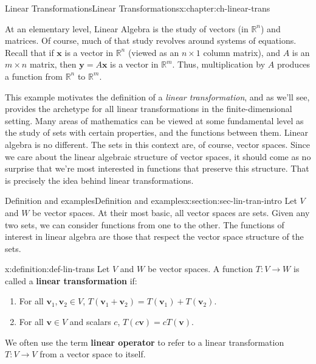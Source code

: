 \documentclass[oneside,10pt,]{book}
\newcommand{\terminology}[1]{\textbf{#1}}
\numberwithin{equation}{section}
\newcommand{\R}{\mathbb{R}}
\newcommand{\vv}{\mathbf{v}}
\newcommand{\xx}{\mathbf{x}}
\newcommand{\yy}{\mathbf{y}}
\begin{document}
\begin{chapterptx}{Linear Transformations}{}{Linear Transformations}{}{}{x:chapter:ch-linear-trans}
\begin{introduction}{}%
At an elementary level, Linear Algebra is the study of vectors (in \(\R^n\)) and matrices. Of course, much of that study revolves around systems of equations. Recall that if \(\xx\) is a vector in \(\R^n\) (viewed as an \(n\times 1\) column matrix), and \(A\) is an \(m\times n\) matrix, then \(\yy=A\xx\) is a vector in \(\R^m\). Thus, multiplication by \(A\) produces a function from \(\R^n\) to \(\R^m\).%
\par
This example motivates the definition of a \emph{linear transformation}, and as we'll see, provides the archetype for all linear transformations in the finite-dimensional setting. Many areas of mathematics can be viewed at some fundamental level as the study of sets with certain properties, and the functions between them. Linear algebra is no different. The sets in this context are, of course, vector spaces. Since we care about the linear algebraic structure of vector spaces, it should come as no surprise that we're most interested in functions that preserve this structure. That is precisely the idea behind linear transformations.%
\end{introduction}%
%
%
\typeout{************************************************}
\typeout{************************************************}
%
\begin{sectionptx}{Definition and examples}{}{Definition and examples}{}{}{x:section:sec-lin-tran-intro}
Let \(V\) and \(W\) be vector spaces. At their most basic, all vector spaces are sets. Given any two sets, we can consider functions from one to the other. The functions of interest in linear algebra are those that respect the vector space structure of the sets.%
\begin{definition}{}{x:definition:def-lin-trans}%
Let \(V\) and \(W\) be vector spaces. A function \(T:V\to W\) is called a \terminology{linear transformation} if:%
\begin{enumerate}
\item{}For all \(\vv_1,\vv_2\in V\), \(T(\vv_1+\vv_2)=T(\vv_1)+T(\vv_2)\).%
\item{}For all \(\vv\in V\) and scalars \(c\), \(T(c\vv)=cT(\vv)\).%
\end{enumerate}
We often use the term \terminology{linear operator} to refer to a linear transformation \(T:V\to V\) from a vector space to itself.%

\end{definition}
\end{sectionptx}
\end{chapterptx}
\end{document}
